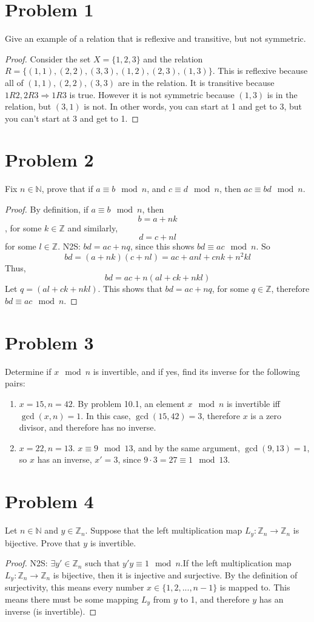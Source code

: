 \documentclass[12pt]{article}
\title{\scalebox{2}{Math 341 Exam 3}}
\author{\scalebox{1.5}{Theo Koss}}
\date{November 2020}
\newcommand{\N}{\mathbb{N}}
\newcommand{\Z}{\mathbb{Z}}
\begin{document}
\maketitle
\section{Problem 1}
Give an example of a relation that is reflexive and transitive, but not symmetric.
\begin{proof}
Consider the set $X=\{1,2,3\}$ and the relation $R=\{(1,1),(2,2),(3,3),(1,2),(2,3),(1,3)\}$. This is reflexive because all of $(1,1),(2,2),(3,3)$ are in the relation. It is transitive because $1R2,2R3\Longrightarrow1R3$ is true. However it is not symmetric because $(1,3)$ is in the relation, but $(3,1)$ is not. In other words, you can start at 1 and get to 3, but you can't start at 3 and get to 1.
\end{proof}
\section{Problem 2}
Fix $n\in\N$, prove that if $a\equiv b\mod{n}$, and $c\equiv d\mod{n}$, then $ac\equiv bd\mod{n}$.
\begin{proof}
By definition, if $a\equiv b\mod{n}$, then $$b=a+nk$$, for some $k\in\Z$ and similarly, $$d=c+nl$$ for some $l\in\Z$. \newline N2S: $bd=ac+nq$, since this shows $bd\equiv ac\mod{n}$. So $$bd=(a+nk)(c+nl)=ac+anl+cnk+n^2kl$$ Thus, $$bd=ac+n(al+ck+nkl)$$ Let $q=(al+ck+nkl)$. This shows that $bd=ac+nq$, for some $q\in\Z$, therefore $bd\equiv ac\mod{n}$.
\end{proof}
\section{Problem 3}
Determine if $x\mod{n}$ is invertible, and if yes, find its inverse for the following pairs:
\begin{enumerate}
    \item $x=15, n=42$. By problem 10.1, an element $x\mod{n}$ is invertible iff $\gcd(x,n)=1$. In this case, $\gcd(15,42)=3$, therefore $x$ is a zero divisor, and therefore has no inverse.
    \item $x=22, n=13$. $x\equiv9\mod{13}$, and by the same argument, $\gcd(9,13)=1$, so $x$ has an inverse, $x'=3$, since $9\cdot3=27\equiv1\mod{13}$.
\end{enumerate}
\section{Problem 4}
Let $n\in\N$ and $y\in\Z_n$. Suppose that the left multiplication map $L_y:\Z_n\to\Z_n$ is bijective. Prove that $y$ is invertible.
\begin{proof}
N2S: $\exists y'\in\Z_n$ such that $y'y\equiv1\mod{n}$.\newline If the left multiplication map $L_y:\Z_n\to\Z_n$ is bijective, then it is injective and surjective. By the definition of surjectivity, this means every number $x\in\{1,2,...,n-1\}$ is mapped to. This means there must be some mapping $L_y$ from $y$ to 1, and therefore $y$ has an inverse (is invertible).
\end{proof}
\end{document}
